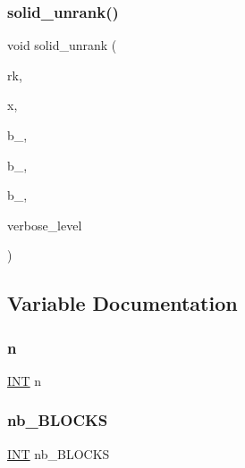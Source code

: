 \mbox{\label{hamming_8_c_ae8486b0f2df6bfbb6fd8d039cd2291a9}} 
\subsubsection{\texorpdfstring{solid\+\_\+unrank()}{solid\_unrank()}}
{\footnotesize\ttfamily void solid\+\_\+unrank (\begin{DoxyParamCaption}\item[{\mbox{\hyperlink{galois_8h_a09fddde158a3a20bd2dcadb609de11dc}{I\+NT}}}]{rk,  }\item[{\mbox{\hyperlink{galois_8h_a09fddde158a3a20bd2dcadb609de11dc}{I\+NT}} $\ast$}]{x,  }\item[{\mbox{\hyperlink{galois_8h_a09fddde158a3a20bd2dcadb609de11dc}{I\+NT}} \&}]{b\+\_,  }\item[{\mbox{\hyperlink{galois_8h_a09fddde158a3a20bd2dcadb609de11dc}{I\+NT}} \&}]{b\+\_,  }\item[{\mbox{\hyperlink{galois_8h_a09fddde158a3a20bd2dcadb609de11dc}{I\+NT}} \&}]{b\+\_,  }\item[{\mbox{\hyperlink{galois_8h_a09fddde158a3a20bd2dcadb609de11dc}{I\+NT}}}]{verbose\+\_\+level }\end{DoxyParamCaption})}



\subsection{Variable Documentation}
\mbox{\label{hamming_8_c_a7f2cd26777ce0ff3fdaf8d02aacbddfb}} 
\subsubsection{\texorpdfstring{n}{n}}
{\footnotesize\ttfamily \mbox{\hyperlink{galois_8h_a09fddde158a3a20bd2dcadb609de11dc}{I\+NT}} n}

\mbox{\label{hamming_8_c_a4ac4f27ca980a0e9c5afac7c3f80a2bc}} 
\subsubsection{\texorpdfstring{nb\+\_\+\+B\+L\+O\+C\+KS}{nb\_BLOCKS}}
{\footnotesize\ttfamily \mbox{\hyperlink{galois_8h_a09fddde158a3a20bd2dcadb609de11dc}{I\+NT}} nb\+\_\+\+B\+L\+O\+C\+KS}

